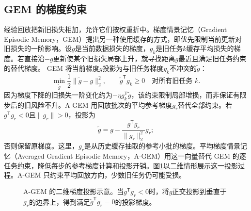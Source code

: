 \subsection{GEM 的梯度约束}
经验回放把新旧损失相加，允许它们按权重折中。梯度情景记忆（Gradient Episodic Memory，GEM）提出另一种使用缓存的方式，即优先限制当前更新对旧损失的一阶影响\cite{lopezpaz2017gem}。设$g$是当前数据损失的梯度，$g_k$是旧任务$k$缓存平均损失的梯度。若直接沿$-g$更新使某个旧损失局部上升，就寻找距离$g$最近且满足旧任务约束的替代梯度。
GEM 将当前梯度$g$投影为与旧任务梯度$g_k$不冲突的$\tilde g$\cite{lopezpaz2017gem}：
\begin{equation}
 \min_{\tilde g}\frac12\|\tilde g-g\|_2^2,
 \qquad \tilde g^{\mathsf T}g_k\geq0\quad\text{对所有旧任务 }k.
\end{equation}
因为梯度下降的旧损失一阶变化约为$-\eta g_k^{\mathsf T}\tilde g$，该约束限制局部增损，而非保证有限步后的旧风险不升。A-GEM 用回放批次的平均参考梯度$g_r$替代全部约束\cite{chaudhry2019agem}。若$g^{\mathsf T}g_r<0$且$\|g_r\|>0$，投影为
\begin{equation}
 \tilde g=g-\frac{g^{\mathsf T}g_r}{\|g_r\|_2^2}g_r;
\end{equation}
否则保留原梯度。这里，$g_r$是从历史缓存抽取的参考小批的梯度。平均梯度情景记忆（Averaged Gradient Episodic Memory，A-GEM）用这一向量替代 GEM 的逐任务约束，降低每步的参考梯度计算和投影开销。图\ref{fig:agem-projection}以二维情形展示这一投影过程。A-GEM 只约束平均回放方向，少数旧任务仍可能受损。

\begin{figure}[htbp]
\centering
{}
\caption{A-GEM 的二维梯度投影示意。当$g^{\mathsf T}g_r<0$时，将$g$正交投影到垂直于$g_r$的边界上，得到满足$\tilde g^{\mathsf T}g_r=0$的投影梯度。}
\label{fig:agem-projection}
\end{figure}

